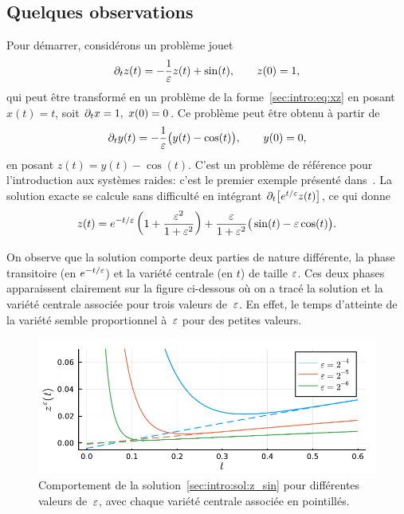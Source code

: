 \subsection*{Quelques observations}

Pour démarrer, considérons un problème jouet
\begin{equation} \label{sec:intro:pb:z_sin}
    \partial_t z(t) = -\frac{1}{\varepsilon}z(t) + \sin(t), 
    \qquad
    z(0) = 1, 
\end{equation}
qui peut être transformé en un problème de la forme~\eqref{sec:intro:eq:xz} en posant $x(t) = t$, soit $\partial_t x = 1,\ x(0) = 0$. Ce problème peut être obtenu à partir de 
\begin{equation*}
    \partial_t y(t) = -\frac{1}{\varepsilon} \big( y(t) - \cos(t) \big), 
    \qquad
    y(0) = 0, 
\end{equation*}
en posant $z(t) = y(t) - \cos(t)$. C'est un problème de référence pour l'introduction aux systèmes raides: c'est le premier exemple présenté dans~\cite{hairer.1996.solving}. La solution exacte se calcule sans difficulté en intégrant $\partial_t \big[ e^{t/\varepsilon} z(t) \big]$, ce qui donne 
\begin{equation} \label{sec:intro:sol:z_sin}
    z(t) = e^{-t/\varepsilon} \left( 1 + \frac{\varepsilon^2}{1+\varepsilon^2} \right)
        + \frac{\varepsilon}{1 + \varepsilon^2} \big( \sin(t) - \varepsilon \cos(t) \big) .
\end{equation}

On observe que la solution comporte deux parties de nature différente, la phase transitoire (en $e^{-t/\varepsilon}$) et la variété centrale (en $t$) de taille $\varepsilon$. Ces deux phases apparaissent clairement sur la figure ci-dessous où on a tracé la solution et la variété centrale associée pour trois valeurs de~$\varepsilon$. En effet, le temps d'atteinte de la variété semble proportionnel à~$\varepsilon$ pour des petites valeurs. 
%
\begin{figure}[!ht]
    \centering
    \includegraphics{./Presentation/z_sin.pdf}
    \caption{Comportement de la solution~\eqref{sec:intro:sol:z_sin} pour différentes valeurs de~$\varepsilon$, avec chaque variété centrale associée en pointillés.}
\end{figure}

